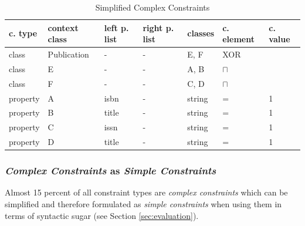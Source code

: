 \documentclass[a4paper,fontsize=11pt]{scrartcl}
\begin{document}

\begin{table}
  \scriptsize
  \sffamily
  \vspace{0cm}
	\caption{Simplified Complex Constraints}
	\label{tab:simplified-complex-constraints}
	\centering
		\begin{tabular}{l|l|l|l|l|l|l}
      \textbf{c. type} & \textbf{context class} & \textbf{left p. list} & \textbf{right p. list} & \textbf{classes} & \textbf{c. element} & \textbf{c. value} \\
      \hline
class & Publication & - & - & E, F & XOR \\
class & E & - & - & A, B & $\sqcap$ \\
class & F & - & - & C, D & $\sqcap$ \\
property & A & isbn & - & string & = & 1 \\
property & B & title & - & string & = & 1 \\
property & C & issn & - & string & = & 1 \\
property & D & title & - & string & = & 1 \\
		\end{tabular}
\end{table}

\subsubsection{\emph{Complex Constraints} as \emph{Simple Constraints}}

Almost 15 percent of all constraint types are \emph{complex constraints} which can be simplified and therefore formulated as \emph{simple constraints} when using them in terms of syntactic sugar (see Section \ref{sec:evaluation}).
\end{document}
